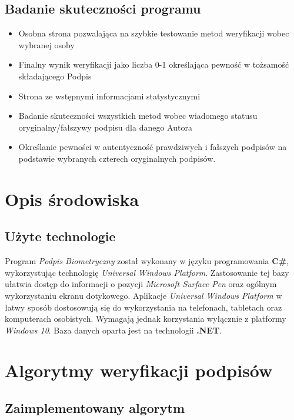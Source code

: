 \documentclass[notitlepage, oneside]{report}
\begin{document}
 \section*{Badanie skuteczności programu}
\begin{itemize}
  \item Osobna strona pozwalająca na szybkie testowanie metod weryfikacji wobec wybranej osoby
  \item Finalny wynik weryfikacji jako liczba 0-1 określająca pewność w tożsamość składającego Podpis
  \item Strona ze wstępnymi informacjami statystycznymi
  \item Badanie skuteczności wszystkich metod wobec wiadomego statusu oryginalny/fałszywy podpisu dla danego Autora
  \item Określanie pewności w autentyczność prawdziwych i fałszych podpisów na podstawie wybranych czterech oryginalnych podpisów.
 \end{itemize}

\chapter*{Opis środowiska}
\section*{Użyte technologie}
Program \textit{Podpis Biometryczny} został wykonany w języku programowania \textbf{C\#}, wykorzystując technologię \textit{Universal Windows Platform}. Zastosowanie tej bazy ułatwia dostęp do informacji o pozycji \textit{Microsoft Surface Pen} oraz ogólnym wykorzystaniu ekranu dotykowego. Aplikacje \textit{Universal Windows Platform} w łatwy sposób dostosowują się do wykorzystania na telefonach, tabletach oraz komputerach osobistych. Wymagają jednak korzystania wyłącznie z platformy  \textit{Windows 10}.
Baza danych oparta jest na technologii \textbf{.NET}.



\chapter*{Algorytmy weryfikacji podpisów}

 \section*{Zaimplementowany algorytm}
 
\end{document}

